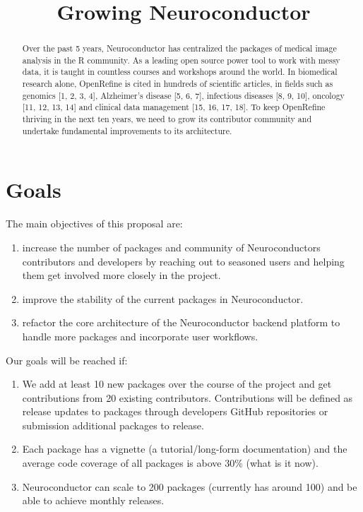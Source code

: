 \documentclass[]{elsarticle} %
\providecommand{\tightlist}{%
  \setlength{\itemsep}{0pt}\setlength{\parskip}{0pt}}
\begin{document}
\begin{frontmatter}

  \title{Growing Neuroconductor}
    
  \begin{abstract}
  Over the past 5 years, Neuroconductor has centralized the packages of medical image analysis in the R community. As a leading open source power tool to work with messy
  data, it is taught in countless courses and workshops around the world. In
  biomedical research alone, OpenRefine is cited in hundreds of scientific articles, in fields such as genomics {[}1, 2, 3, 4{]}, Alzheimer's disease {[}5, 6, 7{]},
  infectious diseases {[}8, 9, 10{]}, oncology {[}11, 12, 13, 14{]} and clinical data management {[}15, 16, 17, 18{]}. To keep OpenRefine thriving in the next ten years,
  we need to grow its contributor community and undertake fundamental improvements to its architecture.
  \end{abstract}
  
 \end{frontmatter}

\hypertarget{goals}{%
\section{Goals}\label{goals}}

The main objectives of this proposal are:

\begin{enumerate}
\def\labelenumi{\arabic{enumi}.}
\tightlist
\item
  increase the number of packages and community of Neuroconductors contributors and developers by reaching out to seasoned users and helping them get involved more closely in the project.
\item
  improve the stability of the current packages in Neuroconductor.
\item
  refactor the core architecture of the Neuroconductor backend platform to handle more packages and incorporate user workflows.
\end{enumerate}

Our goals will be reached if:

\begin{enumerate}
\def\labelenumi{\arabic{enumi}.}
\tightlist
\item
  We add at least 10 new packages over the course of the project and get contributions from 20 existing contributors. Contributions will be defined as release updates to packages through developers GitHub repositories or submission additional packages to release.
\item
  Each package has a vignette (a tutorial/long-form documentation) and the average code coverage of all packages is above 30\% (what is it now).
\item
  Neuroconductor can scale to 200 packages (currently has around 100) and be able to achieve monthly releases.
\end{enumerate}
\end{document}
